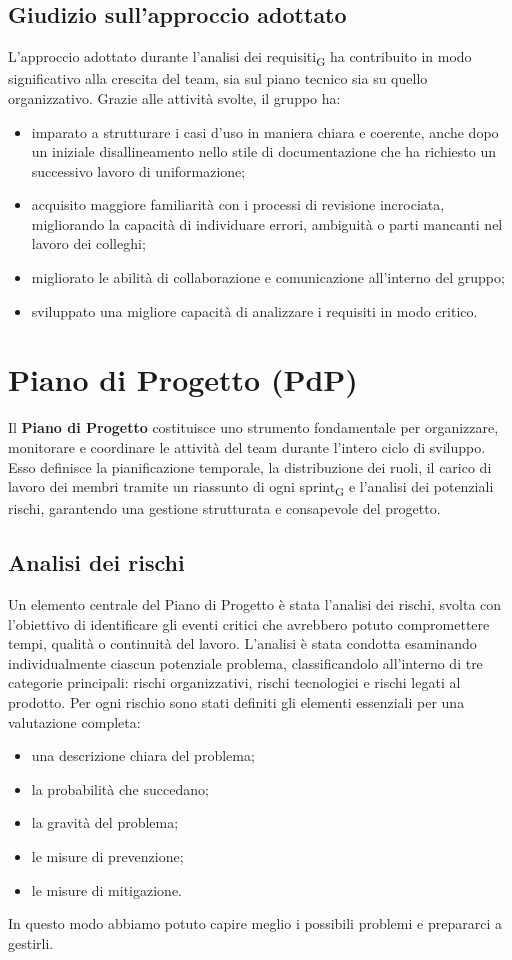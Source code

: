 \documentclass[11pt,a4paper]{article}
\newcommand{\gls}[1]{#1\textsubscript{G}}
\begin{document}
\subsection{Giudizio sull'approccio adottato}
L’approccio adottato durante l’\gls{analisi dei requisiti} ha contribuito in modo significativo alla crescita del team, sia sul piano tecnico sia su quello organizzativo. Grazie alle attività svolte, il gruppo ha:
\begin{itemize}
\item imparato a strutturare i casi d’uso in maniera chiara e coerente, anche dopo un iniziale disallineamento nello stile di documentazione che ha richiesto un successivo lavoro di uniformazione;
\item acquisito maggiore familiarità con i processi di revisione incrociata, migliorando la capacità di individuare errori, ambiguità o parti mancanti nel lavoro dei colleghi;
\item migliorato le abilità di collaborazione e comunicazione all'interno del gruppo;
\item sviluppato una migliore capacità di analizzare i requisiti in modo critico.
\end{itemize}

\newpage

\section{Piano di Progetto (PdP)}
Il \textbf{Piano di Progetto} costituisce uno strumento fondamentale per organizzare, monitorare e coordinare le attività del team durante l’intero ciclo di sviluppo. Esso definisce la pianificazione temporale, la distribuzione dei ruoli, il carico di lavoro dei membri tramite un riassunto di ogni \gls{sprint} e l’analisi dei potenziali rischi, garantendo una gestione strutturata e consapevole del progetto.

\subsection{Analisi dei rischi}
Un elemento centrale del Piano di Progetto è stata l’analisi dei rischi, svolta con l’obiettivo di identificare gli eventi critici che avrebbero potuto compromettere tempi, qualità o continuità del lavoro.
L’analisi è stata condotta esaminando individualmente ciascun potenziale problema, classificandolo all’interno di tre categorie principali: rischi organizzativi, rischi tecnologici e rischi legati al prodotto.
Per ogni rischio sono stati definiti gli elementi essenziali per una valutazione completa:
\begin{itemize}
\item una descrizione chiara del problema;
\item la probabilità che succedano;
\item la gravità del problema;
\item le misure di prevenzione;
\item le misure di mitigazione.
\end{itemize}
In questo modo abbiamo potuto capire meglio i possibili problemi e prepararci a gestirli.
\end{document}
